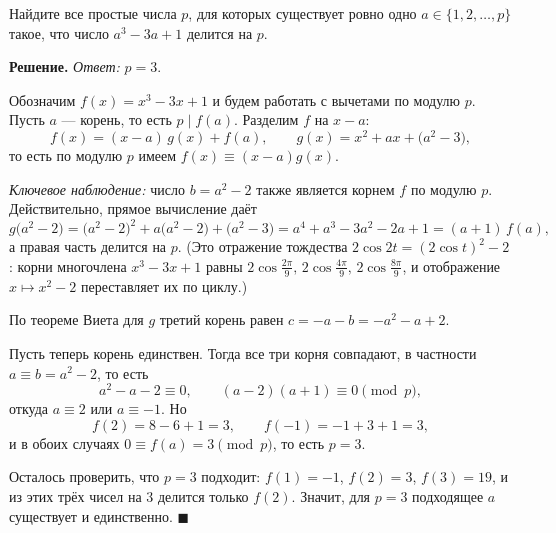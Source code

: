 \q Найдите все простые числа $p$, для которых существует ровно одно $a\in\{1,2,\dots,p\}$ такое, что число $a^3-3a+1$ делится на $p$.

\if{}
\textbf{Решение.} \emph{Ответ:} $p=3$.

Обозначим $f(x)=x^3-3x+1$ и будем работать с вычетами по модулю $p$. Пусть $a$ --- корень, то есть $p\mid f(a)$. Разделим $f$ на $x-a$:
\[
f(x)=(x-a)\,g(x)+f(a),\qquad g(x)=x^2+ax+\bigl(a^2-3\bigr),
\]
то есть по модулю $p$ имеем $f(x)\equiv(x-a)g(x)$.

\emph{Ключевое наблюдение:} число $b=a^2-2$ также является корнем $f$ по модулю $p$. Действительно, прямое вычисление даёт
\[
g\bigl(a^2-2\bigr)=\bigl(a^2-2\bigr)^2+a\bigl(a^2-2\bigr)+\bigl(a^2-3\bigr)
=a^4+a^3-3a^2-2a+1=(a+1)\,f(a),
\]
а правая часть делится на $p$. (Это отражение тождества $2\cos 2t=(2\cos t)^2-2$: корни многочлена $x^3-3x+1$ равны $2\cos\frac{2\pi}{9},\,2\cos\frac{4\pi}{9},\,2\cos\frac{8\pi}{9}$, и отображение $x\mapsto x^2-2$ переставляет их по циклу.)

По теореме Виета для $g$ третий корень равен $c=-a-b=-a^2-a+2$.

Пусть теперь корень единствен. Тогда все три корня совпадают, в частности $a\equiv b=a^2-2$, то есть
\[
a^2-a-2\equiv0,\qquad (a-2)(a+1)\equiv0 \pmod p,
\]
откуда $a\equiv2$ или $a\equiv-1$. Но
\[
f(2)=8-6+1=3,\qquad f(-1)=-1+3+1=3,
\]
и в обоих случаях $0\equiv f(a)=3\pmod p$, то есть $p=3$.

Осталось проверить, что $p=3$ подходит: $f(1)=-1$, $f(2)=3$, $f(3)=19$, и из этих трёх чисел на $3$ делится только $f(2)$. Значит, для $p=3$ подходящее $a$ существует и единственно. \hfill$\blacksquare$
\fi
